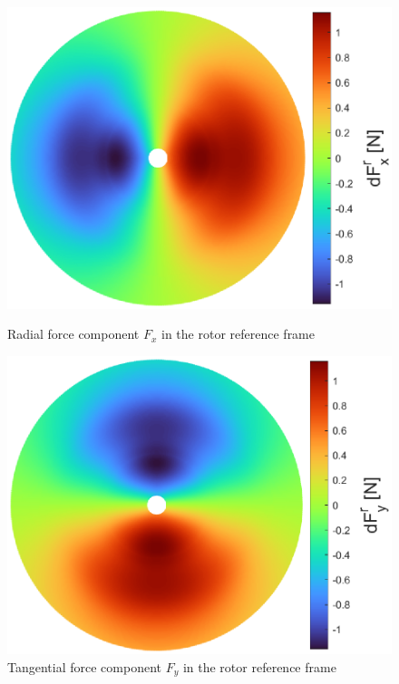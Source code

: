 {\begin{figure}[!htb]
    \centering
    \begin{minipage}{.49\textwidth}
      \centering
      \includegraphics[width=\textwidth]{Figures/comp_method/sim_B/dFx_r.eps}
      \caption{Radial force component $F_x$ in the rotor reference frame}
      \label{fig:radial_force_rotor_paper}
    \end{minipage}%
    \hfill
    \begin{minipage}{.49\textwidth}
      \centering
      \includegraphics[width=\textwidth]{Figures/comp_method/sim_B/dFy_r.eps}
      \caption{Tangential force component $F_y$ in the rotor reference frame}
      \label{fig:tangential_force_rotor_paper}
    \end{minipage}
\end{figure}

}
